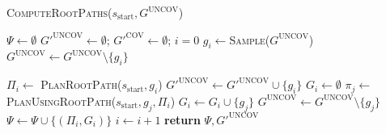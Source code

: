 \documentclass[conference]{IEEEtran}
\begin{document}
\begin{algorithm}
\caption{\textsc{ComputeRootPaths}($s_{\textrm{start}}, G^{\textrm{UNCOV}}$)}
\label{alg:step1}
\begin{algorithmic}[1]
\State $\Psi \leftarrow \emptyset$   
\State $G'^{\textrm{UNCOV}} \leftarrow \emptyset$; \hspace{3mm}
       $G'^{\textrm{COV}} \leftarrow \emptyset$; \hspace{3mm}
       $i = 0$
    \State $g_i \leftarrow$\textsc{Sample}($G^{\textrm{UNCOV}}$)
    \State $G^{\textrm{UNCOV}}\leftarrow G^{\textrm{UNCOV}} \setminus \{g_i\}$
    
    \State $\Pi_i \leftarrow$ \textsc{PlanRootPath}($s_{\textrm{start}}, g_i$)
      
        \State $G'^{\textrm{UNCOV}} \leftarrow G'^{\textrm{UNCOV}} \cup \{g_i\}$
    \Else
        \State $G_i \leftarrow \emptyset$
            \State $\pi_j \leftarrow$\textsc{PlanUsingRootPath}($s_{\textrm{start}},g_j,\Pi_i$)
             
                \State $G_i \leftarrow G_i \cup \{g_j\}$
                \State $G^{\textrm{UNCOV}} \leftarrow G^{\textrm{UNCOV}} \setminus \{g_j\}$
            \EndIf
        \EndFor
        \State $\Psi \leftarrow \Psi \cup \{ (\Pi_i, G_i)\}$
        \State $i \leftarrow i + 1$
    \EndIf
\EndWhile
\State \textbf{return} $\Psi, G'^{\textrm{UNCOV}}$
\end{algorithmic}
\end{algorithm}
\end{document}
